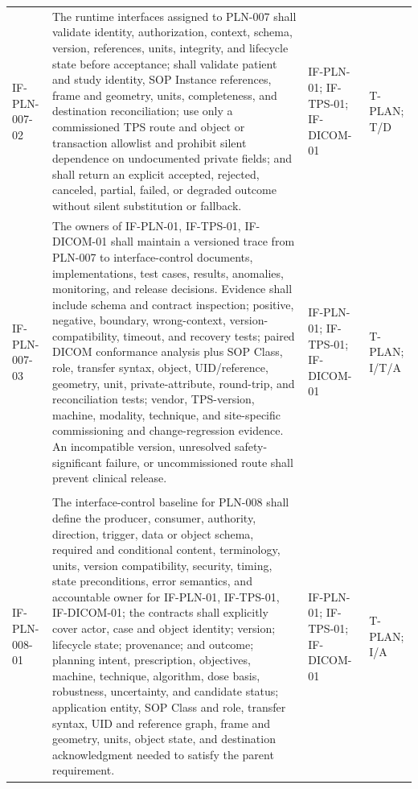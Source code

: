 \documentclass[11pt,letterpaper]{article}
\begin{document}
\begin{scriptsize}
\begin{longtable}{@{}L{0.14\textwidth}L{0.49\textwidth}L{0.19\textwidth}L{0.10\textwidth}@{}}
\addlinespace[2pt]
\mbox{IF-PLN-007-02} & The runtime interfaces assigned to PLN-007 shall validate identity, authorization, context, schema, version, references, units, integrity, and lifecycle state before acceptance; shall validate patient and study identity, SOP Instance references, frame and geometry, units, completeness, and destination reconciliation; use only a commissioned TPS route and object or transaction allowlist and prohibit silent dependence on undocumented private fields; and shall return an explicit accepted, rejected, canceled, partial, failed, or degraded outcome without silent substitution or fallback. & IF-PLN-01; IF-TPS-01; IF-DICOM-01 & T-PLAN; T\slash\allowbreak{}D \\
\addlinespace[2pt]
\mbox{IF-PLN-007-03} & The owners of IF-PLN-01, IF-TPS-01, IF-DICOM-01 shall maintain a versioned trace from PLN-007 to interface-control documents, implementations, test cases, results, anomalies, monitoring, and release decisions. Evidence shall include schema and contract inspection; positive, negative, boundary, wrong-context, version-compatibility, timeout, and recovery tests; paired DICOM conformance analysis plus SOP Class, role, transfer syntax, object, UID\slash\allowbreak{}reference, geometry, unit, private-attribute, round-trip, and reconciliation tests; vendor, TPS-version, machine, modality, technique, and site-specific commissioning and change-regression evidence. An incompatible version, unresolved safety-significant failure, or uncommissioned route shall prevent clinical release. & IF-PLN-01; IF-TPS-01; IF-DICOM-01 & T-PLAN; I\slash\allowbreak{}T\slash\allowbreak{}A \\
\addlinespace[2pt]
 \\
\addlinespace[2pt]
\mbox{IF-PLN-008-01} & The interface-control baseline for PLN-008 shall define the producer, consumer, authority, direction, trigger, data or object schema, required and conditional content, terminology, units, version compatibility, security, timing, state preconditions, error semantics, and accountable owner for IF-PLN-01, IF-TPS-01, IF-DICOM-01; the contracts shall explicitly cover actor, case and object identity; version; lifecycle state; provenance; and outcome; planning intent, prescription, objectives, machine, technique, algorithm, dose basis, robustness, uncertainty, and candidate status; application entity, SOP Class and role, transfer syntax, UID and reference graph, frame and geometry, units, object state, and destination acknowledgment needed to satisfy the parent requirement. & IF-PLN-01; IF-TPS-01; IF-DICOM-01 & T-PLAN; I\slash\allowbreak{}A \\

\end{longtable}
\end{scriptsize}
\end{document}
